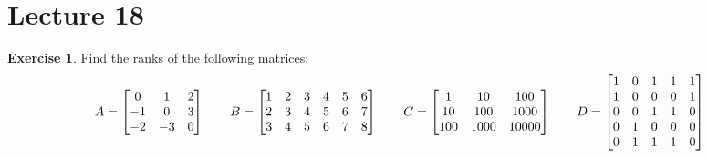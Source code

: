 \documentclass[a4paper]{amsart}
\theoremstyle{definition}
\newtheorem{exercise}{Exercise}
\begin{document}
\section{Lecture 18}

\begin{exercise}\label{ex-rank-i}
 Find the ranks of the following matrices:
 \[ 
  A = \left[\begin{matrix}
   0& 1& 2\\
  -1& 0& 3\\
  -2&-3& 0\\
  \end{matrix}\right] \qquad
  B = \left[\begin{matrix}
   1&2&3&4&5&6\\
   2&3&4&5&6&7\\
   3&4&5&6&7&8\\
  \end{matrix}\right] \qquad
  C = \left[\begin{matrix}
   1&10&100\\
   10&100&1000\\
   100&1000&10000\\
  \end{matrix}\right] \qquad
  D = \left[\begin{matrix}
   1&0&1&1&1\\
   1&0&0&0&1\\
   0&0&1&1&0\\
   0&1&0&0&0\\
   0&1&1&1&0\\
  \end{matrix}\right]
 \]
\end{exercise}
\end{document}
